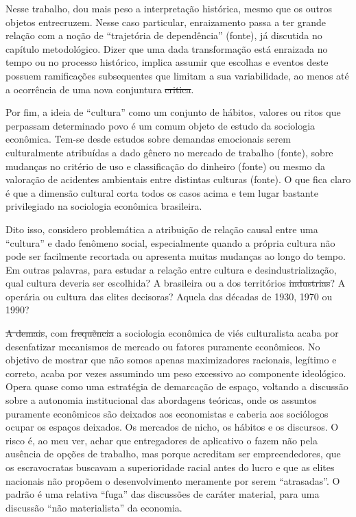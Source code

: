 Nesse trabalho, dou mais peso a interpretação histórica, mesmo que os outros objetos entrecruzem. Nesse caso particular, enraizamento passa a ter grande relação com a noção de ``trajetória de dependência'' (fonte), já discutida no capítulo metodológico. Dizer que uma dada transformação está enraizada no tempo ou no processo histórico, implica assumir que escolhas e eventos deste possuem ramificações subsequentes que limitam a sua variabilidade, ao menos até a ocorrência de uma nova conjuntura \sout{critica}.

Por fim, a ideia de ``cultura'' como um conjunto de hábitos, valores ou ritos que perpassam determinado povo é um comum objeto de estudo da sociologia econômica. Tem-se desde estudos sobre demandas emocionais serem culturalmente atribuídas a dado gênero no mercado de trabalho (fonte), sobre mudanças no critério de uso e classificação do dinheiro (fonte) ou mesmo da valoração de acidentes ambientais entre distintas culturas (fonte). O que fica claro é que a dimensão cultural corta todos os casos acima e tem lugar bastante privilegiado
na sociologia econômica brasileira.

Dito isso, considero problemática a atribuição de relação causal entre uma ``cultura'' e dado fenômeno social, especialmente quando a própria cultura não pode ser facilmente recortada ou apresenta muitas mudanças ao longo do tempo. Em outras palavras, para estudar a relação entre cultura e desindustrialização, qual cultura deveria ser escolhida? A brasileira ou a dos territórios \sout{industrias}? A operária ou cultura das elites decisoras? Aquela das décadas de 1930, 1970 ou 1990? 

\sout{A demais}, com \sout{frequẽncia} a sociologia econômica de viés culturalista
acaba por desenfatizar mecanismos de mercado ou fatores puramente econômicos. No objetivo de mostrar que não somos apenas maximizadores racionais, legítimo e correto, acaba por vezes assumindo um peso excessivo ao componente ideológico. Opera quase como uma estratégia de demarcação de espaço, voltando a discussão sobre a autonomia institucional das abordagens teóricas, onde os assuntos puramente econômicos são deixados aos economistas e caberia aos sociólogos ocupar os espaços deixados. Os mercados de nicho, os hábitos e os discursos. O risco é, ao meu ver, achar que entregadores de aplicativo o fazem não pela ausência de opções de trabalho, mas porque acreditam ser empreendedores, que os escravocratas buscavam
a superioridade racial antes do lucro e que as elites nacionais não
propõem o desenvolvimento meramente por serem ``atrasadas''. O padrão é uma relativa ``fuga'' das discussões de caráter material, para uma discussão ``não materialista'' da economia.

